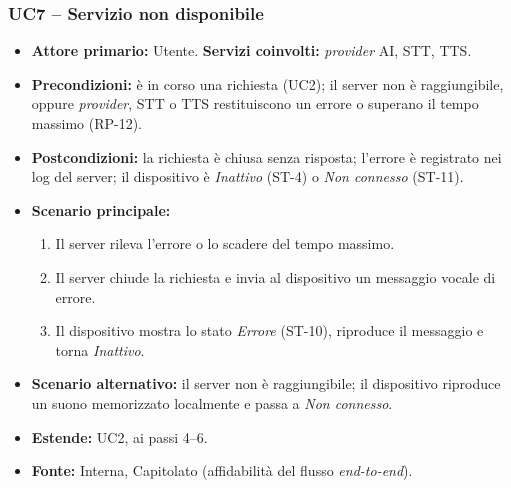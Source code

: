 \documentclass[12pt,a4paper]{article}
\newcommand{\tightlist}{\setlength{\itemsep}{1pt}\setlength{\parskip}{0pt}}
\begin{document}
\subsubsection{UC7 -- Servizio non disponibile}
\begin{itemize}
\tightlist
\item \textbf{Attore primario:} Utente. \textbf{Servizi coinvolti:} \emph{provider} AI, STT, TTS.
\item \textbf{Precondizioni:} è in corso una richiesta (UC2); il server non è raggiungibile, oppure \emph{provider}, STT o TTS restituiscono un errore o superano il tempo massimo (RP-12).
\item \textbf{Postcondizioni:} la richiesta è chiusa senza risposta; l'errore è registrato nei log del server; il dispositivo è \emph{Inattivo} (ST-4) o \emph{Non connesso} (ST-11).
\item \textbf{Scenario principale:}
\begin{enumerate}
\tightlist
\item Il server rileva l'errore o lo scadere del tempo massimo.
\item Il server chiude la richiesta e invia al dispositivo un messaggio vocale di errore.
\item Il dispositivo mostra lo stato \emph{Errore} (ST-10), riproduce il messaggio e torna \emph{Inattivo}.
\end{enumerate}
\item \textbf{Scenario alternativo:} il server non è raggiungibile; il dispositivo riproduce un suono memorizzato localmente e passa a \emph{Non connesso}.
\item \textbf{Estende:} UC2, ai passi 4--6.
\item \textbf{Fonte:} Interna, Capitolato (affidabilità del flusso \emph{end-to-end}).
\end{itemize}
\end{document}
